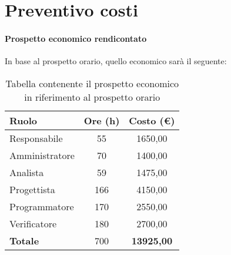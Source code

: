 \section{Preventivo costi}\label{section:Preventivo_costi}


\paragraph{Prospetto economico rendicontato}
In base al prospetto orario, quello economico sarà il seguente:

\begin{table}
	\begin{tabular}{l|cc}
	\rowcolor[HTML]{C0C0C0} 
	\textbf{Ruolo}                       & \textbf{Ore (h)}           & \textbf{Costo (€)}             \\ \hline
	\rowcolor[HTML]{EFEFEF} 
	Responsabile                         & 55                         & 1650,00                        \\
	\rowcolor[HTML]{DEDEDE} 
	Amministratore                       & 70                         & 1400,00                        \\
	\rowcolor[HTML]{E8E8E8} 
	Analista                             & 59                         & 1475,00                        \\
	\rowcolor[HTML]{DEDEDE} 
	Progettista                          & 166                        & 4150,00                        \\
	\rowcolor[HTML]{E8E8E8} 
	Programmatore 						 & 170 						  & 2550,00						   \\
	\rowcolor[HTML]{DEDEDE} 
	Verificatore                         & 180                        & 2700,00                        \\ \hline
	\rowcolor[HTML]{C0C0C0}
	\textbf{Totale}                      & 700                        & \textbf{13925,00}             
	\end{tabular}
	\caption{Tabella contenente il prospetto economico in riferimento al prospetto orario}
\end{table}
